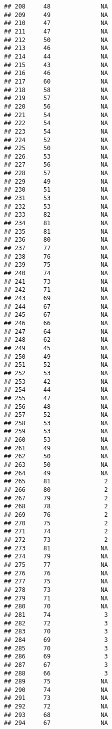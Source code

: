 \documentclass[]{article}
\begin{document}
\begin{verbatim}
## 208     48              NA
## 209     49              NA
## 210     47              NA
## 211     47              NA
## 212     50              NA
## 213     46              NA
## 214     44              NA
## 215     43              NA
## 216     46              NA
## 217     60              NA
## 218     58              NA
## 219     57              NA
## 220     56              NA
## 221     54              NA
## 222     54              NA
## 223     54              NA
## 224     52              NA
## 225     50              NA
## 226     53              NA
## 227     56              NA
## 228     57              NA
## 229     49              NA
## 230     51              NA
## 231     53              NA
## 232     53              NA
## 233     82              NA
## 234     81              NA
## 235     81              NA
## 236     80              NA
## 237     77              NA
## 238     76              NA
## 239     75              NA
## 240     74              NA
## 241     73              NA
## 242     71              NA
## 243     69              NA
## 244     67              NA
## 245     67              NA
## 246     66              NA
## 247     64              NA
## 248     62              NA
## 249     45              NA
## 250     49              NA
## 251     52              NA
## 252     53              NA
## 253     42              NA
## 254     44              NA
## 255     47              NA
## 256     48              NA
## 257     52              NA
## 258     53              NA
## 259     53              NA
## 260     53              NA
## 261     49              NA
## 262     50              NA
## 263     50              NA
## 264     49              NA
## 265     81               2
## 266     80               2
## 267     79               2
## 268     78               2
## 269     76               2
## 270     75               2
## 271     74               2
## 272     73               2
## 273     81              NA
## 274     79              NA
## 275     77              NA
## 276     76              NA
## 277     75              NA
## 278     73              NA
## 279     71              NA
## 280     70              NA
## 281     74               3
## 282     72               3
## 283     70               3
## 284     69               3
## 285     70               3
## 286     69               3
## 287     67               3
## 288     66               3
## 289     75              NA
## 290     74              NA
## 291     73              NA
## 292     72              NA
## 293     68              NA
## 294     67              NA

\end{verbatim}
\end{document}
